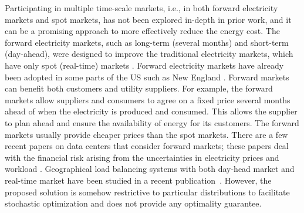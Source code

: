 Participating in multiple time-scale markets, i.e., in both forward electricity markets and spot markets, has not been explored in-depth in prior work, and it can be a promising approach to more effectively reduce the energy cost. The forward electricity markets, such as long-term (several months) and short-term (day-ahead), were designed to improve the traditional electricity markets, which have only spot (real-time) markets \cite{ausubel2010using}. Forward electricity markets have already been adopted in some parts of the US such as New England \cite{cramton2007colombia}. Forward markets can benefit both customers and utility suppliers. For example, the forward markets allow suppliers and consumers to agree on a fixed price several months ahead of when the electricity is produced and consumed. This allows the supplier to plan ahead and ensure the availability of energy for its customers. The forward markets usually provide cheaper prices than the spot markets. 
There are a few recent papers on data centers that consider forward markets; these papers deal with the financial risk arising from the uncertainties in electricity prices and workload \cite{rao2011hedging,yu2012risk}. 
Geographical load balancing systems with both day-head market and real-time market have been studied in a recent publication~\cite{ghamkhari2016energy}. However, the proposed solution is somehow restrictive to particular distributions to facilitate stochastic optimization and does not provide any optimality guarantee.



